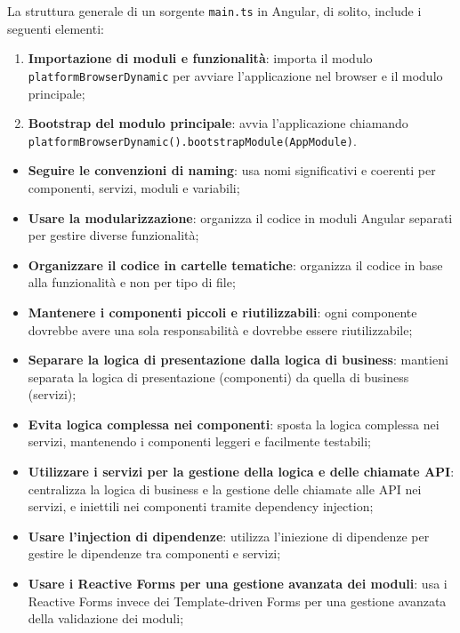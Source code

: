 La struttura generale di un sorgente \texttt{main.ts} in Angular, di solito, include i seguenti elementi:
\begin{enumerate}
    \item \textbf{Importazione di moduli e funzionalità}: importa il modulo \\ \texttt{platformBrowserDynamic} per avviare l'applicazione nel browser e il modulo principale;
    \item \textbf{Bootstrap del modulo principale}: avvia l'applicazione chiamando \\ \texttt{platformBrowserDynamic().bootstrapModule(AppModule)}.
\end{enumerate}

\begin{itemize}
    \item \textbf{Seguire le convenzioni di naming}: usa nomi significativi e coerenti per componenti, servizi, moduli e variabili;
    \item \textbf{Usare la modularizzazione}: organizza il codice in moduli Angular separati per gestire diverse funzionalità;
    \item \textbf{Organizzare il codice in cartelle tematiche}: organizza il codice in base alla funzionalità e non per tipo di file;
    \item \textbf{Mantenere i componenti piccoli e riutilizzabili}: ogni componente dovrebbe avere una sola responsabilità e dovrebbe essere riutilizzabile;
    \item \textbf{Separare la logica di presentazione dalla logica di business}: mantieni separata la logica di presentazione (componenti) da quella di business (servizi);
    \item \textbf{Evita logica complessa nei componenti}: sposta la logica complessa nei servizi, mantenendo i componenti leggeri e facilmente testabili;
    \item \textbf{Utilizzare i servizi per la gestione della logica e delle chiamate API}: centralizza la logica di business e la gestione delle chiamate alle API nei servizi, e iniettili nei componenti tramite dependency injection;
    \item \textbf{Usare l'injection di dipendenze}: utilizza l'iniezione di dipendenze per gestire le dipendenze tra componenti e servizi;
    \item \textbf{Usare i Reactive Forms per una gestione avanzata dei moduli}: usa i Reactive Forms invece dei Template-driven Forms per una gestione avanzata della validazione dei moduli;

\end{itemize}
